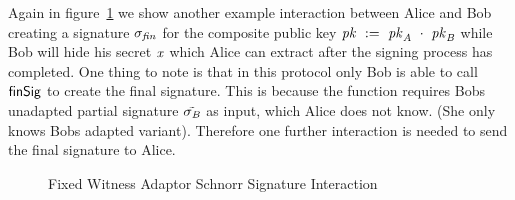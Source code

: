 Again in figure~\ref{fig:apt-schnorr-interaction} we show another example interaction between Alice and Bob creating a signature $\sigma_{\mathit{fin}}$ for the composite public key $\mathit{pk} ~:=~ \mathit{pk}_{\mathit{A}} ~\cdot~ \mathit{pk}_{\mathit{B}}$
while Bob will hide his secret $\mathit{x}$ which Alice can extract after the signing process has completed. One thing to note is that in this protocol only Bob is able to call $\mathsf{finSig}$ to create the final signature. This
is because the function requires Bobs unadapted partial signature $\tilde{\sigma_{\mathit{B}}}$ as input, which Alice does not know. (She only knows Bobs adapted variant). Therefore one further interaction is needed to send the final
signature to Alice.

\begin{figure}
    \caption{Fixed Witness Adaptor Schnorr Signature Interaction}
    \label{fig:apt-schnorr-interaction}
\end{figure}

